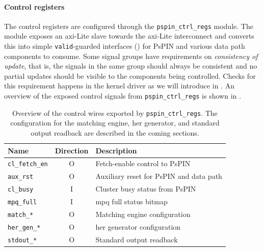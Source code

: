 \paragraph{Control registers} The control registers are configured through the \texttt{pspin\_\-ctrl\_\-regs} module.  The module exposes an \ac{axi}-Lite slave towards the \ac{axi}-Lite interconnect and converts this into simple \texttt{valid}-guarded interfaces () for PsPIN and various data path components to consume.  Some signal groups have requirements on \emph{consistency of update}, that is, the signals in the same group should always be consistent and no partial updates should be visible to the components being controlled.  Checks for this requirement happens in the kernel driver as we will introduce in .  An overview of the exposed control signals from \texttt{pspin\_\-ctrl\_\-regs} is shown in .

\begin{table}[ht]
    \centering
    \begin{tabular}{lcl}
    \toprule
    Name & Direction & Description \\ \midrule
    \texttt{cl\_fetch\_en} & O & Fetch-enable control to PsPIN \\
    \texttt{aux\_rst} & O & Auxiliary reset for PsPIN and data path \\
    \texttt{cl\_busy} & I & Cluster busy status from PsPIN \\
    \texttt{mpq\_full} & I & \ac{mpq} full status bitmap \\
    \texttt{match\_*} & O & Matching engine configuration \\
    \texttt{her\_gen\_*} & O & \ac{her} generator configuration \\
    \texttt{stdout\_*} & O & Standard output readback \\
    \bottomrule
    \end{tabular}
    \caption{Overview of the control wires exported by \texttt{pspin\_ctrl\_regs}.  The configuration for the matching engine, \ac{her} generator, and standard output readback are described in the coming sections.  }
    \label{tab:ctrl-signals}
\end{table}

